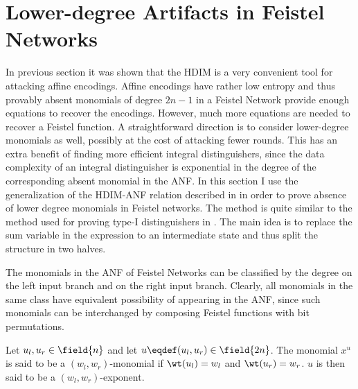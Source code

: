 \section{Lower-degree Artifacts in Feistel Networks}

In previous section it was shown that the HDIM is a very convenient tool for attacking affine encodings. Affine encodings have rather low entropy and thus provably absent monomials of degree $2n-1$ in a Feistel Network provide enough equations to recover the encodings. However, much more equations are needed to recover a Feistel function. A straightforward direction is to consider lower-degree monomials as well, possibly at the cost of attacking fewer rounds. This has an extra benefit of finding more efficient integral distinguishers, since the data complexity of an integral distinguisher is exponential in the degree of the corresponding absent monomial in the ANF. In this section I use the generalization of the HDIM-ANF relation described in  in order to prove absence of lower degree monomials in Feistel networks. The method is quite similar to the method used for proving type-I distinguishers in . The main idea is to replace the sum variable in the expression to an intermediate state and thus split the structure in two halves.

The monomials in the ANF of Feistel Networks can be classified by the degree on the left input branch and on the right input branch. Clearly, all monomials in the same class have equivalent possibility of appearing in the ANF, since such monomials can be interchanged by composing Feistel functions with bit permutations.

\begin{definition}[($(w_l,w_r)$-monomials]
Let $u_l,u_r \in \field{n}$ and let $u \eqdef (u_l, u_r) \in \field{2n}$.
The monomial $x^u$ is said to be a $(w_l,w_r)$-monomial if $\wt(u_l) = w_l$ and $\wt(u_r) = w_r$. $u$ is then said to be a $(w_l,w_r)$-exponent.
\end{definition}

